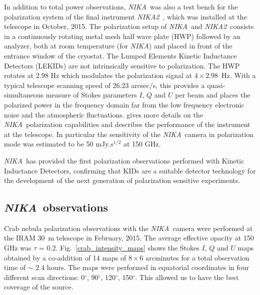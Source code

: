 \documentclass[twocolumn,traditabstract]{aa}
\def\NIKA{\textit{NIKA}}
\def\NIKAd{\textit{NIKA2}}
\begin{document}
In addition to total power observations, \NIKA\ was also a test
bench for the polarization system of the final instrument
\NIKAd\ \citep{calvo2016,catalano2016nika2,2017arXiv170700908A}, which was installed at the
telescope in October, 2015. The polarization setup of \NIKA\ and
\NIKAd\ consists in a continuously rotating metal mesh half wave plate (HWP)
followed by an analyzer, both at room temperature (for \NIKA) and placed in
front of the entrance window of the cryostat. The Lumped Elements Kinetic
Inductance Detectors (LEKIDs) are not intrinsically sensitive to
polarization. The HWP rotates at 2.98 Hz which modulates the polarization signal
at $4\times 2.98$~Hz. With a typical telescope scanning speed of 26.23 arcsec/s,
this provides a quasi-simultaneous measure of Stokes parameters $I$, $Q$ and $U$
per beam and
places the polarized power in the frequency domain far from the low frequency
electronic noise and the atmospheric fluctuations. \cite{ritacco2017} gives more
details on the \NIKA\ polarization capabilities and describes the performance of
the instrument at the telescope. In particular the sensitivity of the
\NIKA\ camera in polarization mode was estimated to be 50 mJy.$s^{1/2}$ at 150
GHz.

\NIKA\ has provided the first polarization
observations performed with Kinetic Inductance Detectors, confirming that KIDs are a
suitable detector technology for the development of the next generation of polarization sensitive
experiments.

\subsection{\NIKA\ observations}\label{sec:nika_observations}
Crab nebula polarization observations with the \NIKA\ camera were performed at
the IRAM 30~m telescope in February, 2015. The average effective opacity at 150 GHz was $\tau$ = 0.2.  Fig.~\ref{crab_intensity_maps} shows
the Stokes $I$, $Q$ and $U$ maps obtained by a co-addition of 14 maps
of $8 \times 6$ arcminutes for a total observation time of $\sim$ 2.4 hours. The
maps were performed in equatorial coordinates in four different scan
directions: 0$^{\circ}$, 90$^{\circ}$, 120$^{\circ}$, 150$^{\circ}$. This
allowed us to have the best coverage of the source.%
\end{document}
